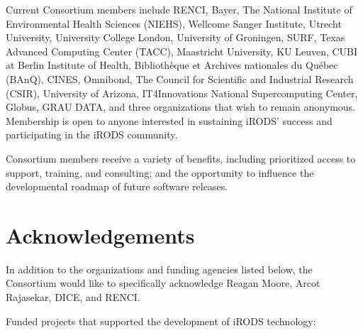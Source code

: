 \documentclass[10pt,oneside]{memoir}
\begin{document}
Current Consortium members include RENCI, Bayer, The National Institute of Environmental Health Sciences (NIEHS), Wellcome Sanger Institute, Utrecht University, University College London, University of Groningen, SURF, Texas Advanced Computing Center (TACC), Maastricht University, KU Leuven, CUBI at Berlin Institute of Health, Bibliothèque et Archives nationales du Québec (BAnQ), CINES, Omnibond, The Council for Scientific and Industrial Research (CSIR), University of Arizona, IT4Innovations National Supercomputing Center, Globus, GRAU DATA, and three organizations that wish to remain anonymous. Membership is open to anyone interested in sustaining iRODS' success and participating in the iRODS community.

Consortium members receive a variety of benefits, including prioritized access to support, training, and consulting; and the opportunity to influence the developmental roadmap of future software releases.


\newpage
\section{Acknowledgements}

In addition to the organizations and funding agencies listed below, the Consortium would like to specifically acknowledge Reagan Moore, Arcot Rajasekar, DICE, and RENCI.

Funded projects that supported the development of iRODS technology:
\end{document}
